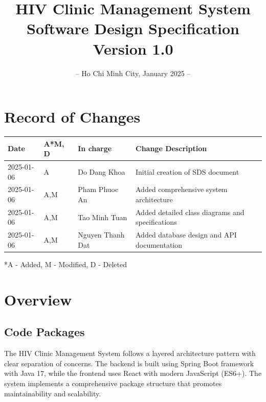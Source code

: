 \documentclass[12pt,a4paper]{article}
\title{
    \vspace{-2cm}
    \Huge\textbf{HIV Clinic Management System}\\
    \vspace{1cm}
    \Large\textbf{Software Design Specification}\\
    \vspace{2cm}
    \normalsize Version 1.0
}
\author{}
\date{
    \vspace{4cm}
    – Ho Chi Minh City, January 2025 –
}
\begin{document}
\maketitle
\thispagestyle{empty}

\newpage

\section*{Record of Changes}
\begin{longtable}{|p{3cm}|p{2cm}|p{3cm}|p{6cm}|}
\hline
\textbf{Date} & \textbf{A*M, D} & \textbf{In charge} & \textbf{Change Description} \\
\hline
2025-01-06 & A & Do Dang Khoa & Initial creation of SDS document \\
\hline
2025-01-06 & A,M & Pham Phuoc An & Added comprehensive system architecture \\
\hline
2025-01-06 & A,M & Tao Minh Tuan  & Added detailed class diagrams and specifications \\
\hline
2025-01-06 & A,M & Nguyen Thanh Dat & Added database design and API documentation \\
\hline
\end{longtable}

\footnotesize{*A - Added, M - Modified, D - Deleted}

\newpage

\tableofcontents

\newpage

\section{Overview}

\subsection{Code Packages}

The HIV Clinic Management System follows a layered architecture pattern with clear separation of concerns. The backend is built using Spring Boot framework with Java 17, while the frontend uses React with modern JavaScript (ES6+). The system implements a comprehensive package structure that promotes maintainability and scalability.
\end{document}
